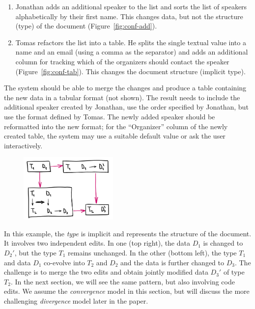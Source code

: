 \documentclass[english,submission]{programming}
\DeclareRobustCommand{\frameworkbox}[1]{\leftbar#1\endleftbar}
\newcommand{\frameworkboxtitle}[1]{\noindent{\firamedium #1.}\quad}
\begin{document}
\begin{enumerate}
\item Jonathan adds an additional speaker to the list and sorts the list of speakers
  alphabetically by their first name. This changes data, but not the structure (type) of
  the document (Figure~\ref{fig:conf-add}).
\item Tomas refactors the list into a table. He splits the single textual value
  into a name and an email (using a comma as the separator) and adds an additional column for
  tracking which of the organizers should contact the speaker (Figure~\ref{fig:conf-tab}).
  This changes the document structure (implicit type).
\end{enumerate}

\noindent
The system should be able to merge the changes and produce a table containing the new data
in a tabular format (not shown). The result needs to include the additional speaker
created by Jonathan, use the order specified by Jonathan, but use the format defined by
Tomas. The newly added speaker should be reformatted into the new format; for the
``Organizer'' column of the newly created table, the system may use a suitable default value
or ask the user interactively.

\frameworkbox{
\begin{figure}
\vspace{-0.5em}
\includegraphics[width=13em]{figures/arr-datafork.png}
\vspace{-1em}
\end{figure}
\frameworkboxtitle{Merging Data and Code Edits}
In this example, the \emph{type} is implicit and represents the structure of the document.
It involves two independent edits. In one (top right), the data $D_1$ is
changed to $D_2'$, but the type $T_1$ remains unchanged. In the other (bottom left), the
type $T_1$ and data $D_1$ co-evolve into $T_2$ and $D_2$ and the data is further changed
to $D_3$. The challenge is to merge the two edits and obtain jointly modified data $D_3'$
of type $T_2$. In the next section, we will see the same pattern, but also involving
code edits. We assume the \emph{convergence} model in this section, but will discuss
the more challenging \emph{divergence} model later in the paper.}
\end{document}

